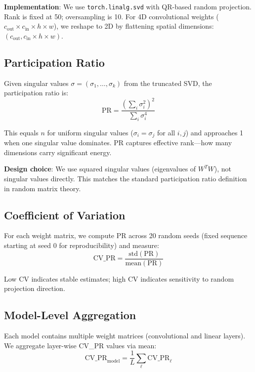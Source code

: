 \textbf{Implementation}: We use \texttt{torch.linalg.svd} with QR-based random projection. Rank is fixed at 50; oversampling is 10. For 4D convolutional weights ($c_{\text{out}} \times c_{\text{in}} \times h \times w$), we reshape to 2D by flattening spatial dimensions: $(c_{\text{out}}, c_{\text{in}} \times h \times w)$.

\subsection{Participation Ratio}

Given singular values $\sigma = (\sigma_1, \ldots, \sigma_k)$ from the truncated SVD, the participation ratio is:
\begin{equation}
\text{PR} = \frac{(\sum_i \sigma_i^2)^2}{\sum_i \sigma_i^4}
\end{equation}

This equals $n$ for uniform singular values ($\sigma_i = \sigma_j$ for all $i,j$) and approaches 1 when one singular value dominates. PR captures effective rank---how many dimensions carry significant energy.

\textbf{Design choice}: We use squared singular values (eigenvalues of $W^T W$), not singular values directly. This matches the standard participation ratio definition in random matrix theory.

\subsection{Coefficient of Variation}

For each weight matrix, we compute PR across 20 random seeds (fixed sequence starting at seed 0 for reproducibility) and measure:
\begin{equation}
\text{CV\_PR} = \frac{\text{std}(\text{PR})}{\text{mean}(\text{PR})}
\end{equation}

Low CV indicates stable estimates; high CV indicates sensitivity to random projection direction.

\subsection{Model-Level Aggregation}

Each model contains multiple weight matrices (convolutional and linear layers). We aggregate layer-wise CV\_PR values via mean:
\begin{equation}
\text{CV\_PR}_{\text{model}} = \frac{1}{L} \sum_{\ell} \text{CV\_PR}_{\ell}
\end{equation}

